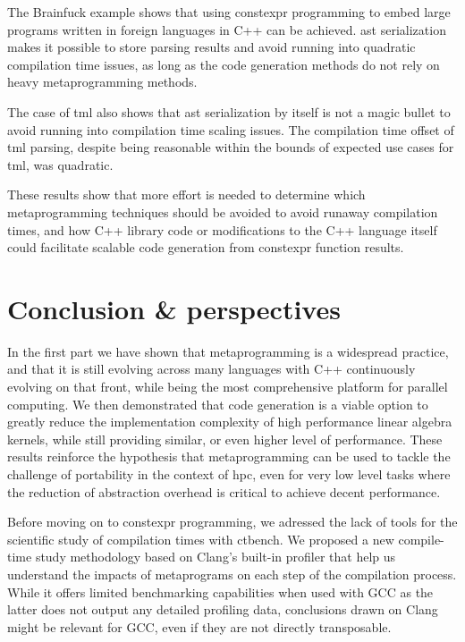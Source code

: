 \documentclass[english,12pt,a4paper]{book}
\providecommand{\cpp}{\textsc{C++}\xspace}
\begin{document}
The Brainfuck example shows that using \gls{constexpr} programming to embed
large programs written in foreign languages in \cpp can be achieved.
\gls{ast} serialization makes it possible to store parsing results
and avoid running into quadratic compilation time issues, as long as
the code generation methods do not rely on heavy metaprogramming methods.

The case of \gls{tml} also shows that \gls{ast} serialization
by itself is not a magic bullet to avoid running into compilation time
scaling issues.
The compilation time offset of \gls{tml} parsing, despite being reasonable
within the bounds of expected use cases for \gls{tml}, was quadratic.

These results show that more effort is needed to determine which metaprogramming
techniques should be avoided to avoid runaway compilation times,
and how \cpp library code or modifications to the \cpp language itself
could facilitate scalable code generation from \gls{constexpr} function results.

\chapter*{Conclusion \& perspectives}

In the first part we have shown that metaprogramming is a widespread practice,
and that it is still evolving across many languages with \cpp continuously
evolving on that front, while being the most comprehensive platform for
parallel computing.
We then demonstrated that code generation is a viable option to greatly reduce
the implementation complexity of high performance linear algebra kernels,
while still providing similar, or even higher level of performance.
These results reinforce the hypothesis that metaprogramming can be used to
tackle the challenge of portability in the context of \acrlong{hpc},
even for very low level tasks where the reduction of abstraction overhead
is critical to achieve decent performance.

Before moving on to \gls{constexpr} programming, we adressed the lack of
tools for the scientific study of compilation times with ctbench.
We proposed a new compile-time study methodology based on Clang's built-in
profiler that help us understand the impacts of metaprograms on each step
of the compilation process. While it offers limited benchmarking capabilities
when used with GCC as the latter does not output any detailed profiling data,
conclusions drawn on Clang might be relevant for GCC, even if they are not
directly transposable.
\end{document}
